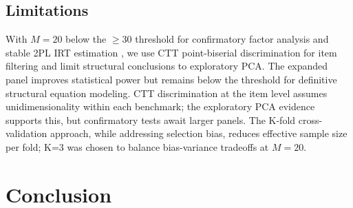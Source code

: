 \documentclass{article} %
\begin{document}
\subsection{Limitations}
\label{sec:limitations}

With $M=20$ below the $\geq$30 threshold for confirmatory factor
analysis and stable 2PL IRT estimation \citep{konig2020optimized,
fujimoto2020bayesian}, we use CTT point-biserial discrimination for
item filtering and limit structural conclusions to exploratory PCA.
The expanded panel improves statistical power but remains below the
threshold for definitive structural equation modeling.
CTT discrimination at the item level assumes unidimensionality within
each benchmark; the exploratory PCA evidence supports this, but
confirmatory tests await larger panels.
The K-fold cross-validation approach, while addressing selection bias,
reduces effective sample size per fold; K=3 was chosen to balance
bias-variance tradeoffs at $M=20$.

\section{Conclusion}
\label{sec:conclusion}
\end{document}
